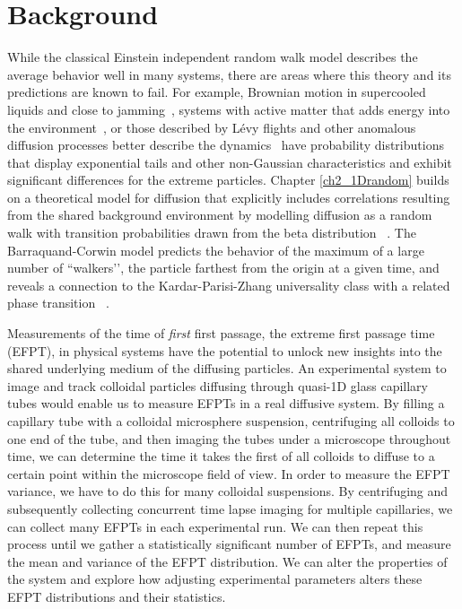 \section{Background}
While the classical Einstein independent random walk model describes the average behavior well in many systems, there are areas where this theory and its predictions are known to fail. 
For example, Brownian motion in supercooled liquids and close to jamming~\cite{wang_when_2012}, systems with active matter that adds energy into the environment~\cite{kanazawa_loopy_2020,ramaswamy_mechanics_2010}, or those described by Lévy flights and other anomalous diffusion processes better describe the dynamics~\cite{ghosh_non-universal_2015,levy,bouchaud_anomalous_1990,metzler_brownian_2019} have probability distributions that display exponential tails and other non-Gaussian characteristics and exhibit significant differences for the extreme particles.
Chapter \ref{ch2_1Drandom} builds on a theoretical model for diffusion that explicitly includes correlations resulting from the shared background environment by modelling diffusion as a random walk with transition probabilities drawn from the beta distribution~ \cite{barraquand_random-walk_2017}. The Barraquand-Corwin model predicts the behavior of the maximum of a large number of ``walkers’’, the particle farthest from the origin at a given time, and reveals a connection to the Kardar-Parisi-Zhang universality class with a related phase transition~ \cite{barraquand_random-walk_2017, barraquand_moderate_2020, le_doussal_diffusion_2017, kardar_dynamic_1986,hass_anomalous_2023}.

Measurements of the time of \emph{first} first passage, the extreme first passage time (EFPT), in physical systems have the potential to unlock new insights into the shared underlying medium of the diffusing particles. An experimental system to image and track colloidal particles diffusing through quasi-1D glass capillary tubes would enable us to measure EFPTs in a real diffusive system. By filling a capillary tube with a colloidal microsphere suspension, centrifuging all colloids to one end of the tube, and then imaging the tubes under a microscope throughout time, we can determine the time it takes the first of all colloids to diffuse to a certain point within the microscope field of view. In order to measure the EFPT variance, we have to do this for many colloidal suspensions. By centrifuging and subsequently collecting concurrent time lapse imaging for multiple capillaries, we can collect many EFPTs in each experimental run. We can then repeat this process until we gather a statistically significant number of EFPTs, and measure the mean and variance of the EFPT distribution. We can alter the properties of the system and explore how adjusting experimental parameters alters these EFPT distributions and their statistics.

